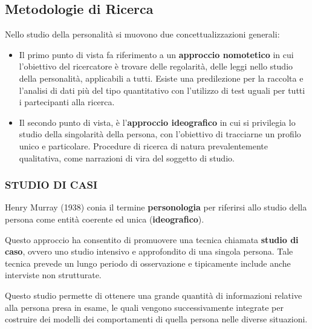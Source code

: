 \documentclass{subfiles}
\begin{document}
\subsection{Metodologie di Ricerca}
    Nello studio della personalità si muovono due concettualizzazioni generali: 

    \begin{itemize}
        \item Il primo punto di vista fa riferimento a un \textbf{approccio nomotetico} in cui 
        l'obiettivo del ricercatore è trovare delle regolarità, delle leggi nello studio della 
        personalità, applicabili a tutti. Esiste una predilezione per la raccolta e l'analisi di 
        dati più del tipo quantitativo con l'utilizzo di test uguali per tutti i partecipanti alla 
        ricerca.
        
        \item Il secondo punto di vista, è l'\textbf{approccio ideografico} in cui si privilegia 
        lo studio della singolarità della persona, con l'obiettivo di tracciarne un profilo unico 
        e particolare. Procedure di ricerca di natura prevalentemente qualitativa, come narrazioni 
        di vira del soggetto di studio. 
    \end{itemize}

    \subsubsection*{STUDIO DI CASI}
        Henry Murray (1938) conia il termine \textbf{personologia} per riferirsi allo studio 
        della persona come entità coerente ed unica (\textbf{ideografico}).

        Questo approccio ha consentito di promuovere una tecnica chiamata \textbf{studio di caso}, 
        ovvero uno studio intensivo e approfondito di una singola persona.
        Tale tecnica prevede un lungo periodo di osservazione e tipicamente include anche interviste 
        non strutturate.

        Questo studio permette di ottenere una grande quantità di informazioni relative alla 
        persona presa in esame, le quali vengono successivamente integrate per costruire dei 
        modelli dei comportamenti di quella persona nelle diverse situazioni.
\end{document}
